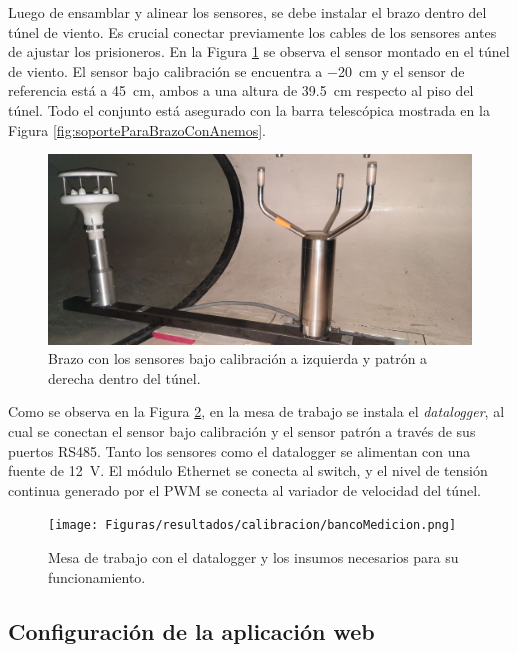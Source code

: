 Luego de ensamblar y alinear los sensores, se debe instalar el brazo dentro del túnel de viento. Es crucial conectar previamente los cables de los sensores antes de ajustar los prisioneros. En la Figura \ref{fig:deltaMontajeTunel} se observa el sensor montado en el túnel de viento. El sensor bajo calibración se encuentra a \SI{-20}{\centi\meter} y el sensor de referencia está a \SI{45}{\centi\meter}, ambos a una altura de \SI{39.5}{\centi\meter} respecto al piso del túnel. Todo el conjunto está asegurado con la barra telescópica mostrada en la Figura \ref{fig:soporteParaBrazoConAnemos}.


\begin{figure}[H]
    \centering
    \includegraphics[width=0.6\linewidth]{Figuras/resultados/calibracion/HD51_3/deltaMontajeTunel.jpg}
    \caption{Brazo con los sensores bajo calibración a izquierda y patrón a derecha dentro del túnel.}
    \label{fig:deltaMontajeTunel}
\end{figure}

Como se observa en la Figura \ref{fig:datalogger3}, en la mesa de trabajo se instala el \textit{datalogger}, al cual se conectan el sensor bajo calibración y el sensor patrón a través de sus puertos RS485. Tanto los sensores como el datalogger se alimentan con una fuente de \SI{12}{\volt}. El módulo Ethernet se conecta al switch, y el nivel de tensión continua generado por el PWM se conecta al variador de velocidad del túnel.

\begin{figure}[H]
    \centering
    \texttt{[image: Figuras/resultados/calibracion/bancoMedicion.png]}
    \caption{Mesa de trabajo con el datalogger y los insumos necesarios para su funcionamiento.}
    \label{fig:datalogger3}
\end{figure}

\subsection{Configuración de la aplicación web}

